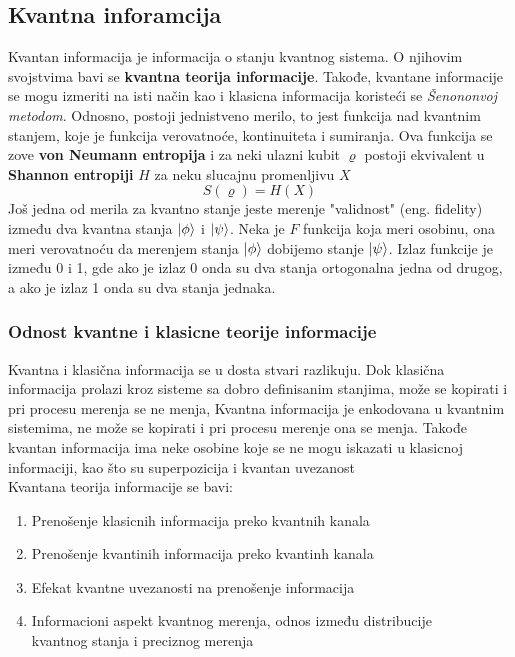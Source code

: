 \documentclass[12pt, letterpaper, oneside]{article}
\begin{document}
\subsection{Kvantna inforamcija}
Kvantan informacija je informacija o stanju kvantnog sistema. O njihovim svojstvima bavi se \textbf{kvantna teorija informacije}.
Takođe, kvantane informacije se mogu izmeriti na isti način kao i klasicna informacija koristeći se \textit{Šenononvoj metodom}. 
Odnosno, postoji jednistveno merilo, to jest funkcija nad kvantnim stanjem, koje je funkcija verovatnoće, kontinuiteta i sumiranja.\cite{vlatko_v}
Ova funkcija se zove \textbf{von Neumann entropija} i za neki ulazni kubit $\varrho$ postoji ekvivalent u  \textbf{Shannon entropiji} $H$
za neku slucajnu promenljivu $X$
\[
    S(\varrho) = H(X)
\]
Još jedna od merila za kvantno stanje jeste merenje "validnost" (eng. fidelity) između dva kvantna stanja $\ket{\phi}$ i $\ket{\psi}$.
Neka je $F$ funkcija koja meri osobinu, ona meri verovatnoću da merenjem stanja $\ket{\phi}$ dobijemo stanje $\ket{\psi}$.
Izlaz funkcije je između 0 i 1, gde ako je izlaz 0 onda su dva stanja ortogonalna jedna od drugog, a ako je izlaz 1 onda su dva stanja jednaka.\cite{vlatko_v}
\subsubsection*{Odnost kvantne i klasicne teorije informacije}
Kvantna i klasična informacija se u dosta stvari razlikuju. Dok klasična informacija prolazi kroz sisteme sa dobro definisanim stanjima, može se kopirati i pri procesu merenja se ne menja,
Kvantna informacija je enkodovana u kvantnim sistemima, ne može se kopirati i pri procesu merenje ona se menja. Takođe kvantan informacija ima neke osobine koje se ne
mogu iskazati u klasicnoj informaciji, kao što su superpozicija i kvantan uvezanost \cite{Classical&quantum_info} \\
Kvantana teorija informacije se bavi: 
\begin{enumerate}
    \item Prenošenje klasicnih informacija preko kvantnih kanala
    \item Prenošenje kvantinih informacija preko kvantinh kanala
    \item Efekat kvantne uvezanosti na prenošenje informacija
    \item Informacioni aspekt kvantnog merenja, odnos između distribucije \\
    kvantnog stanja i preciznog merenja
\end{enumerate}
\end{document}
